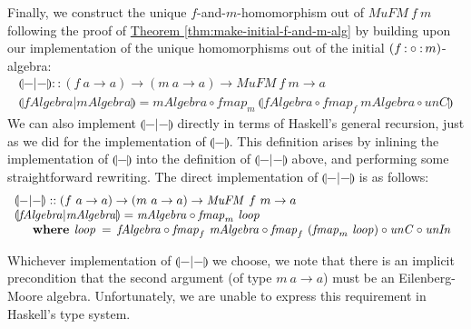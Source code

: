 \documentclass{jfp1}
\newcommand{\fold}[1]{\llparenthesis #1 \rrparenthesis}
\newcommand{\eFold}[2]{\llparenthesis #1|#2 \rrparenthesis}
\newcommand{\thmref}[1]{\hyperref[#1]{Theorem \ref*{#1}}}
\newcommand{\kw}[1]{\textbf{#1}}
\begin{document}
Finally, we construct the unique $f$-and-$m$-homomorphism out of
$\mathit{MuFM}~f~m$ following the proof of
\thmref{thm:make-initial-f-and-m-alg} by building upon our
implementation of the unique homomorphisms out of the initial $(f
\mathop{\mathord:\circ\mathord:} m)$-algebra:
\begin{displaymath}
  \begin{array}{l}
    \eFold{-}{-} :: (f~a \to a) \to (m~a \to a) \to \mathit{MuFM}~f~m \to a \\
    \eFold{\mathit{fAlgebra}}{\mathit{mAlgebra}} = \mathit{mAlgebra} \circ \mathit{fmap}_m~\fold{\mathit{fAlgebra} \circ \mathit{fmap}_f~\mathit{mAlgebra} \circ \mathit{unC}}
  \end{array}
\end{displaymath}
We can also implement $\eFold{-}{-}$ directly in terms of Haskell's
general recursion, just as we did for the implementation of
$\fold{-}$. This definition arises by inlining the implementation of
$\fold{-}$ into the definition of $\eFold{-}{-}$ above, and performing
some straightforward rewriting. The direct implementation of
$\eFold{-}{-}$ is as follows:
\begin{displaymath}
  \begin{array}{l}
    \eFold{-}{-} :: (f~a \to a) \to (m~a \to a) \to \mathit{MuFM}~f~m \to a \\
    \eFold{\mathit{fAlgebra}}{\mathit{mAlgebra}} = \mathit{mAlgebra} \circ \mathit{fmap}_m~\mathit{loop} \\
    \quad\begin{array}{r@{\hspace{0.4em}}l@{\hspace{0.5em}}c@{\hspace{0.5em}}l}
      \kw{where} & \mathit{loop} &=& \mathit{fAlgebra} \circ \mathit{fmap}_f~\mathit{mAlgebra} \circ \mathit{fmap}_f~(\mathit{fmap}_m~\mathit{loop}) \circ \mathit{unC} \circ \mathit{unIn}
    \end{array}
  \end{array}
\end{displaymath}

Whichever implementation of $\eFold{-}{-}$ we choose, we note that
there is an implicit precondition that the second argument (of type
$m~a \to a$) must be an Eilenberg-Moore algebra. Unfortunately, we are
unable to express this requirement in Haskell's type system. 

\end{document}

